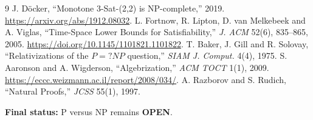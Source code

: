 \documentclass[11pt]{article}
\newcommand{\OPEN}{\textbf{OPEN}}
\begin{document}
\begin{thebibliography}{9}
 J. D\"ocker, ``Monotone 3-Sat-(2,2) is NP-complete,''
2019. \url{https://arxiv.org/abs/1912.08032}.
 L. Fortnow, R. Lipton, D. van Melkebeek and A. Viglas,
``Time-Space Lower Bounds for Satisfiability,'' \emph{J. ACM} 52(6),
835--865, 2005. \url{https://doi.org/10.1145/1101821.1101822}.
 T. Baker, J. Gill and R. Solovay, ``Relativizations of the
$P=?NP$ question,'' \emph{SIAM J. Comput.} 4(4), 1975.
 S. Aaronson and A. Wigderson, ``Algebrization,''
\emph{ACM TOCT} 1(1), 2009.
\url{https://eccc.weizmann.ac.il/report/2008/034/}.
 A. Razborov and S. Rudich, ``Natural Proofs,''
\emph{JCSS} 55(1), 1997.
\end{thebibliography}

\noindent\textbf{Final status:} P versus NP remains \OPEN.

\end{document}
